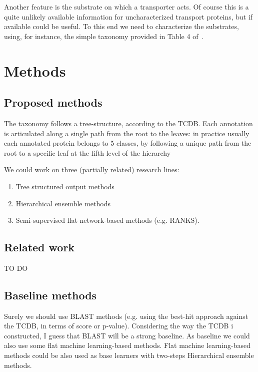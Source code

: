 \documentclass[english]{article}
\begin{document}
Another feature is the substrate on which a transporter acts. Of course this is a quite unlikely available information for uncharacterized transport proteins,  but if available could be useful. To this end we need to characterize the substrates, using, for instance, the simple taxonomy provided in Table 4 of~\cite{Saier00}.


\section{Methods}
\label{}

\subsection{Proposed methods}
\label{}
The taxonomy follows a tree-structure, according to the TCDB. Each annotation is articulated along a single path from the root to the leaves: in practice usually each annotated protein belongs to 5 classes, by following a unique path from the root to a specific leaf at the fifth level of the hierarchy

We could work on three (partially related) research lines:
\begin{enumerate}
\item Tree structured output methods
\item Hierarchical ensemble methods
\item Semi-supervised flat network-based methods (e.g. RANKS).

\end{enumerate}


\subsection{Related work}
\label{}
TO DO


\subsection{Baseline methods}
\label{}
Surely we should use BLAST methods (e.g. using the best-hit approach against the TCDB, in terms of score or p-value). Considering the way the TCDB i constructed, I guess that BLAST will be a strong baseline.
As baseline we could also use some flat machine learning-based methods. Flat machine learning-based methods could be also used as base learners with two-steps Hierarchical ensemble methods.



\end{document}
